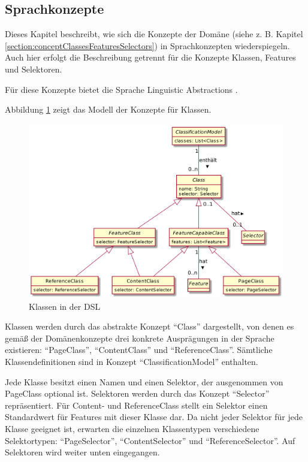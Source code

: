 \subsection{Sprachkonzepte}
    \label{solutionDetails:dslConcepts}
    Dieses Kapitel beschreibt, wie sich die Konzepte der Domäne
    (siehe z. B. Kapitel \ref{section:conceptClassesFeaturesSelectors})
    in Sprachkonzepten wiederspiegeln.
    Auch hier erfolgt die Beschreibung getrennt für die Konzepte Klassen,
    Features und Selektoren.

    Für diese Konzepte bietet die Sprache Linguistic Abstractions
    \cite[Kapitel 4.1, 4.1.2]{voelter:DslEngineering}.

    Abbildung \ref{image:dslClasses} zeigt das Modell der Konzepte für Klassen.

    \begin{figure}[htb]
        \centering
        \includegraphics[width=\textwidth]{../resources/dsl/classes.png}
        \caption{Klassen in der DSL}
        \label{image:dslClasses}
    \end{figure}

    Klassen werden durch das abstrakte Konzept "`Class"' dargestellt,
    von denen es gemäß der Domänenkonzepte drei konkrete Ausprägungen in der Sprache
    existieren: "`PageClass"', "`ContentClass"' und "`ReferenceClass"'.
    Sämtliche Klassendefinitionen sind in Konzept "`ClassificationModel"' enthalten.

    Jede Klasse besitzt einen Namen und einen Selektor,
    der ausgenommen von PageClass optional ist.
    Selektoren werden durch das Konzept "`Selector"' repräsentiert.
    Für Content- und ReferenceClass stellt ein Selektor einen Standardwert
    für Features mit dieser Klasse dar.
    Da nicht jeder Selektor für jede Klasse geeignet ist,
    erwarten die einzelnen Klassentypen verschiedene Selektortypen:
    "`PageSelector"', "`ContentSelector"' und "`ReferenceSelector"'.
    Auf Selektoren wird weiter unten eingegangen.

